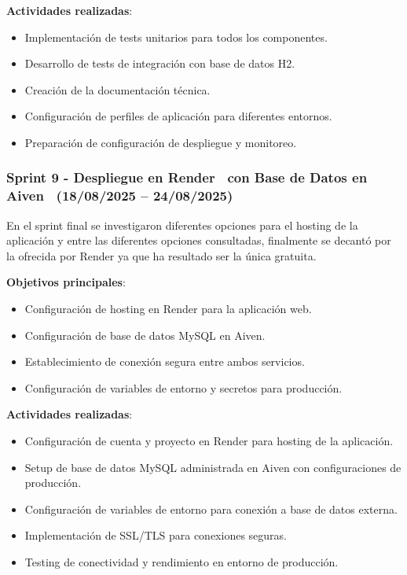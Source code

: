\textbf{Actividades realizadas}:
\begin{itemize}
\tightlist
\item
Implementación de tests unitarios para todos los componentes.
\item
Desarrollo de tests de integración con base de datos H2.
\item
Creación de la documentación técnica.
\item
Configuración de perfiles de aplicación para diferentes entornos.
\item
Preparación de configuración de despliegue y monitoreo.
\end{itemize}

\subsubsection{Sprint 9 - Despliegue en Render~\cite{render} con Base de Datos en Aiven~\cite{aiven} (18/08/2025 – 24/08/2025)} 
En el sprint final se investigaron diferentes opciones para el hosting de la aplicación y entre las diferentes opciones consultadas, finalmente se decantó por la ofrecida por Render ya que ha resultado ser la única gratuita.

\textbf{Objetivos principales}:
\begin{itemize}
\tightlist
\item
Configuración de hosting en Render para la aplicación web.
\item
Configuración de base de datos MySQL en Aiven.
\item
Establecimiento de conexión segura entre ambos servicios.
\item
Configuración de variables de entorno y secretos para producción.
\end{itemize}

\textbf{Actividades realizadas}:
\begin{itemize}
\tightlist
\item
Configuración de cuenta y proyecto en Render para hosting de la aplicación.
\item
Setup de base de datos MySQL administrada en Aiven con configuraciones de producción.
\item
Configuración de variables de entorno para conexión a base de datos externa.
\item
Implementación de SSL/TLS para conexiones seguras.
\item
Testing de conectividad y rendimiento en entorno de producción.
\end{itemize}

